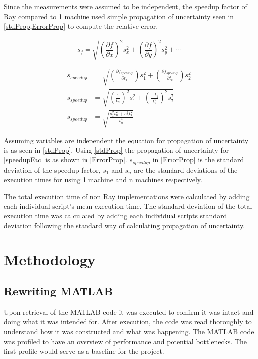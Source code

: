 \documentclass[12pt, a4paper]{article}
\begin{document}
Since the measurements were assumed to be independent, the speedup factor of Ray compared to 1 machine used simple propagation of uncertainty seen in \cref{stdProp,ErrorProp} to compute the relative error.

\begin{equation}\label{stdProp}
    s_f = \sqrt{\left(\frac{\partial f}{\partial x}\right)^2s_x^2 + \left(\frac{\partial f}{\partial y}\right)^2s_y^2 + \cdots}
\end{equation}

\begin{equation}\label{ErrorProp}
    \begin{aligned}
        s_{speedup} &=  \sqrt{\left(\frac{\partial f_{speedup}}{\partial t_1}\right)s_1^2 + \left(\frac{\partial f_{speedup}}{\partial t_n}\right)s_2^2} \\
        s_{speedup} &= \sqrt{\left(\frac{1}{t_n}\right)^2s_1^2 + \left(\frac{-t_1}{t_2^2}\right)^2s_2^2}\\
        s_{speedup} &= \sqrt{\frac{s_{1}^2t_n^2 + s_{n}^2t_1^2}{t_n^4}}
    \end{aligned}
\end{equation}

Assuming variables are independent the equation for propagation of uncertainty is as seen in \cref{stdProp}.
Using \cref{stdProp} the propagation of uncertainty for \cref{speedupFac} is as shown in \cref{ErrorProp}.
$s_{speedup}$ in \cref{ErrorProp} is the standard deviation of the speedup factor, $s_1$ and $s_n$ are the standard deviations of the execution times for using 1 machine and n machines respectively.

The total execution time of non Ray implementations were calculated by adding each individual script's mean execution time.
The standard deviation of the total execution time was calculated by adding each individual scripts standard deviation following the standard way of calculating propagation of uncertainty.

\section{Methodology}

\subsection{Rewriting MATLAB}

Upon retrieval of the MATLAB code it was executed to confirm it was intact and doing what it was intended for. 
After execution, the code was read thoroughly to understand how it was constructed and what was happening.
The MATLAB code was profiled to have an overview of performance and potential bottlenecks.
The first profile would serve as a baseline for the project.
\end{document}

